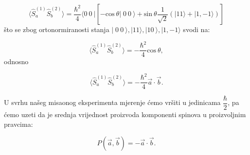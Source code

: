 \begin{equation}
    \langle  \hat{S}_a^{(1)}\hat{S}_b^{(2)} \rangle = \frac{\hbar^2}{4} \langle 0 \:\! 0 \:\! | \left[ - \mathrm{cos} \:\! \theta| \;\! 0 \:\! 0 \:\! \rangle + \mathrm{sin} \:\! \theta \frac{1}{\sqrt{2}} \left( | 11 \rangle + | 1, {-1} \rangle \right) \right]
\end{equation}
što se zbog ortonormiranosti stanja $| \;\! 0 \:\! 0 \:\! \rangle,| 11 \rangle,| 1 0 \:\! \rangle,| 1,{-1}\rangle$ svodi na:

\begin{equation}
    \langle  \hat{S}_a^{(1)}\hat{S}_b^{(2)} \rangle = -\frac{\hbar^2}{4}\mathrm{cos} \:\! \theta,
\end{equation}
odnosno

\begin{equation}
    \langle  \hat{S}_a^{(1)}\hat{S}_b^{(2)} \rangle = -\frac{\hbar^2}{4} \vec{a} \cdot \vec{b}.
\end{equation}

U svrhu našeg misaonog eksperimenta mjerenje ćemo vršiti u jedinicama $\dfrac{\hbar}{2}$, pa ćemo uzeti da je srednja vrijednost proizvoda komponenti spinova u proizvoljnim pravcima:

\begin{equation}
    P(\vec{a}, \vec{b}) = - \vec{a} \cdot \vec{b}.
\end{equation}